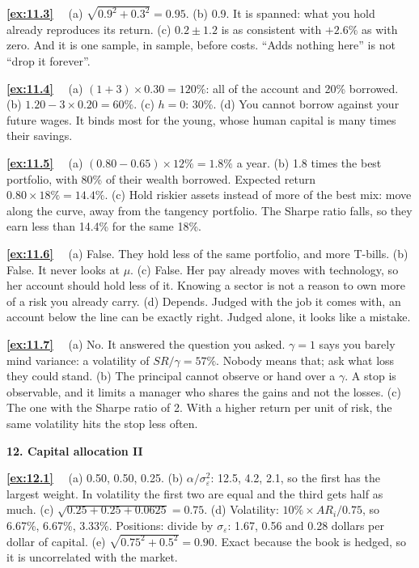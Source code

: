 \documentclass[11pt]{article}
\newcounter{ex}[section]
\newcommand{\sol}[1]{\par\smallskip\textbf{\ref{#1}}\ \ }
\newcommand{\head}[1]{\par\medskip\textbf{#1}\par}
\newcommand{\SR}{\mathit{SR}}
\newcommand{\AR}{\mathit{AR}}
\begin{document}
{\sol{ex:11.3} (a) $\sqrt{0.9^{2} + 0.3^{2}} = 0.95$. (b) 0.9. It is spanned: what you hold already reproduces its return.
(c) $0.2 \pm 1.2$ is as consistent with $+2.6\%$ as with zero. And it is one sample, in sample, before costs. ``Adds
nothing here'' is not ``drop it forever''.

\sol{ex:11.4} (a) $(1 + 3)\times 0.30 = 120\%$: all of the account and 20\% borrowed. (b) $1.20 - 3\times 0.20 = 60\%$.
(c) $h = 0$: 30\%. (d) You cannot borrow against your future wages. It binds most for the young, whose human capital
is many times their savings.

\sol{ex:11.5} (a) $(0.80 - 0.65)\times 12\% = 1.8\%$ a year. (b) 1.8 times the best portfolio, with 80\% of their wealth
borrowed. Expected return $0.80\times 18\% = 14.4\%$. (c) Hold riskier assets instead of more of the best mix: move along
the curve, away from the tangency portfolio. The Sharpe ratio falls, so they earn less than 14.4\% for the same 18\%.

\sol{ex:11.6} (a) False. They hold less of the same portfolio, and more T-bills. (b) False. It never looks at $\mu$.
(c) False. Her pay already moves with technology, so her account should hold less of it. Knowing a sector is not a
reason to own more of a risk you already carry. (d) Depends. Judged with the job it comes with, an account below the
line can be exactly right. Judged alone, it looks like a mistake.

\sol{ex:11.7} (a) No. It answered the question you asked. $\gamma = 1$ says you barely mind variance: a volatility of
$\SR/\gamma = 57\%$. Nobody means that; ask what loss they could stand. (b) The principal cannot observe or hand over a
$\gamma$. A stop is observable, and it limits a manager who shares the gains and not the losses. (c) The one with the
Sharpe ratio of 2. With a higher return per unit of risk, the same volatility hits the stop less often.

\head{12. Capital allocation II}

\sol{ex:12.1} (a) 0.50, 0.50, 0.25. (b) $\alpha/\sigma_{\varepsilon}^{2}$: 12.5, 4.2, 2.1, so the first has the largest
weight. In volatility the first two are equal and the third gets half as much. (c) $\sqrt{0.25 + 0.25 + 0.0625} = 0.75$.
(d) Volatility: $10\%\times\AR_{i}/0.75$, so 6.67\%, 6.67\%, 3.33\%. Positions: divide by $\sigma_{\varepsilon}$: 1.67, 0.56
and 0.28 dollars per dollar of capital. (e) $\sqrt{0.75^{2} + 0.5^{2}} = 0.90$. Exact because the book is hedged, so it is
uncorrelated with the market.

}
\end{document}
